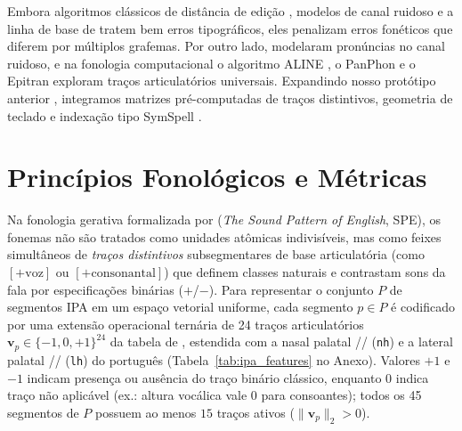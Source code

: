 \documentclass[a4paper, twocolumn, 11pt, twoside]{article}
\begin{document}
Embora algoritmos clássicos de distância de edição \citep{damerau1964technique}, modelos de canal ruidoso \citep{church1991probability,brill2000improved} e a linha de base de \citet{norvig2007spell} tratem bem erros tipográficos, eles penalizam erros fonéticos que diferem por múltiplos grafemas. Por outro lado, \citet{toutanova2002pronunciation} modelaram pronúncias no canal ruidoso, e na fonologia computacional o algoritmo ALINE \citep{kondrak2003phonetic}, o PanPhon \citep{mortensen2016panphon} e o Epitran \citep{mortensen2018epitran} exploram traços articulatórios universais. Expandindo nosso protótipo anterior \citep{araujo2018phonetic}, integramos matrizes pré-computadas de traços distintivos, geometria de teclado e indexação tipo SymSpell \citep{garbe2012symspell}.

\section{Princípios Fonológicos e Métricas}
\label{sec:fonologia}
Na fonologia gerativa formalizada por \citet{chomsky1968sound} (\textit{The Sound Pattern of English}, SPE), os fonemas não são tratados como unidades atômicas indivisíveis, mas como feixes simultâneos de \emph{traços distintivos} subsegmentares de base articulatória (como $[+\text{voz}]$ ou $[+\text{consonantal}]$) que definem classes naturais e contrastam sons da fala por especificações binárias ($+$/$-$). Para representar o conjunto $P$ de segmentos IPA em um espaço vetorial uniforme, cada segmento $p \in P$ é codificado por uma extensão operacional ternária de 24 traços articulatórios $\mathbf{v}_p \in \{-1, 0, +1\}^{24}$ da tabela de \citet{hulden2012distinctive}, estendida com a nasal palatal // (\texttt{nh}) e a lateral palatal /\textturny/ (\texttt{lh}) do português (Tabela~\ref{tab:ipa_features} no Anexo). Valores $+1$ e $-1$ indicam presença ou ausência do traço binário clássico, enquanto $0$ indica traço não aplicável (ex.: altura vocálica vale $0$ para consoantes); todos os 45 segmentos de $P$ possuem ao menos $15$ traços ativos ($\lVert \mathbf{v}_p \rVert_2 > 0$).
\end{document}
